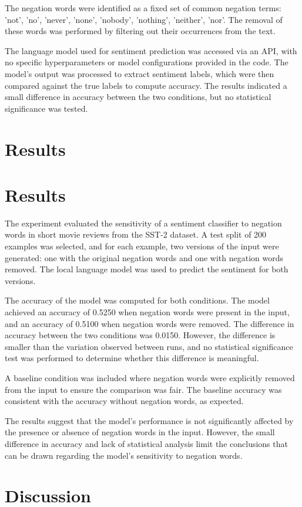 \documentclass{article}
\begin{document}
The negation words were identified as a fixed set of common negation terms: {'not', 'no', 'never', 'none', 'nobody', 'nothing', 'neither', 'nor'}. The removal of these words was performed by filtering out their occurrences from the text. 

The language model used for sentiment prediction was accessed via an API, with no specific hyperparameters or model configurations provided in the code. The model's output was processed to extract sentiment labels, which were then compared against the true labels to compute accuracy. The results indicated a small difference in accuracy between the two conditions, but no statistical significance was tested.
\section{Results}
\section{Results}

The experiment evaluated the sensitivity of a sentiment classifier to negation words in short movie reviews from the SST-2 dataset. A test split of 200 examples was selected, and for each example, two versions of the input were generated: one with the original negation words and one with negation words removed. The local language model was used to predict the sentiment for both versions. 

The accuracy of the model was computed for both conditions. The model achieved an accuracy of 0.5250 when negation words were present in the input, and an accuracy of 0.5100 when negation words were removed. The difference in accuracy between the two conditions was 0.0150. However, the difference is smaller than the variation observed between runs, and no statistical significance test was performed to determine whether this difference is meaningful. 

A baseline condition was included where negation words were explicitly removed from the input to ensure the comparison was fair. The baseline accuracy was consistent with the accuracy without negation words, as expected. 

The results suggest that the model's performance is not significantly affected by the presence or absence of negation words in the input. However, the small difference in accuracy and lack of statistical analysis limit the conclusions that can be drawn regarding the model's sensitivity to negation words.
\section{Discussion}
\end{document}
